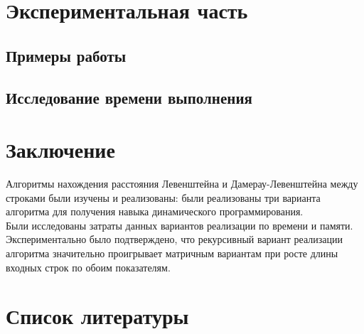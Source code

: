\documentclass[12pt]{report}
\begin{document}
	\chapter{Экспериментальная часть}
	\section{Примеры работы}
	
   \section{Исследование времени выполнения}
   

   \chapter*{Заключение}
	Алгоритмы нахождения расстояния Левенштейна и Дамерау-Левенштейна между строками были изучены и реализованы: были реализованы три варианта алгоритма для получения навыка динамического программирования.\\
	Были исследованы затраты данных вариантов реализации по времени и памяти. Экспериментально было подтверждено, что рекурсивный вариант реализации алгоритма значительно проигрывает матричным вариантам при росте длины входных строк по обоим показателям.

	\chapter*{Список литературы}
\end{document}
